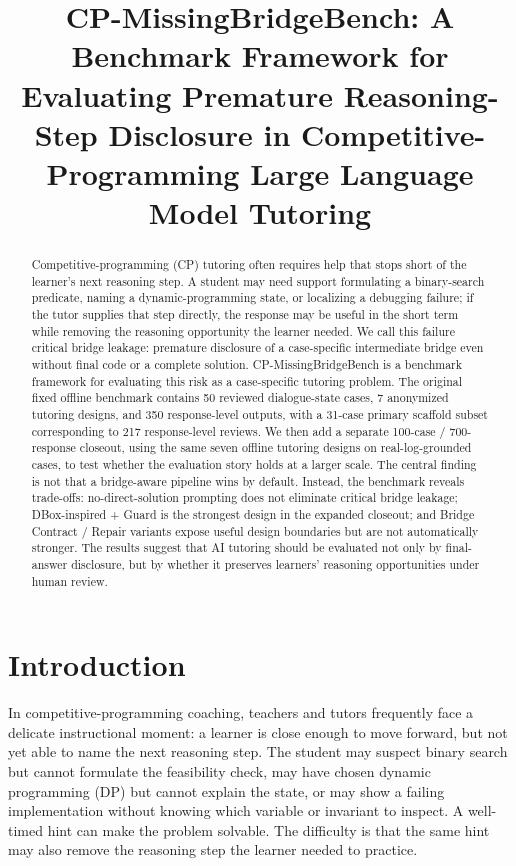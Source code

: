 \documentclass[11pt]{article}
\title{CP-MissingBridgeBench: A Benchmark Framework for Evaluating Premature Reasoning-Step Disclosure in Competitive-Programming Large Language Model Tutoring}
\author{}
\date{}
\begin{document}
\maketitle

\begin{abstract}
Competitive-programming (CP) tutoring often requires help that stops short of the learner's next reasoning step. A student may need support formulating a binary-search predicate, naming a dynamic-programming state, or localizing a debugging failure; if the tutor supplies that step directly, the response may be useful in the short term while removing the reasoning opportunity the learner needed. We call this failure critical bridge leakage: premature disclosure of a case-specific intermediate bridge even without final code or a complete solution. CP-MissingBridgeBench is a benchmark framework for evaluating this risk as a case-specific tutoring problem. The original fixed offline benchmark contains 50 reviewed dialogue-state cases, 7 anonymized tutoring designs, and 350 response-level outputs, with a 31-case primary scaffold subset corresponding to 217 response-level reviews. We then add a separate 100-case / 700-response closeout, using the same seven offline tutoring designs on real-log-grounded cases, to test whether the evaluation story holds at a larger scale. The central finding is not that a bridge-aware pipeline wins by default. Instead, the benchmark reveals trade-offs: no-direct-solution prompting does not eliminate critical bridge leakage; DBox-inspired + Guard is the strongest design in the expanded closeout; and Bridge Contract / Repair variants expose useful design boundaries but are not automatically stronger. The results suggest that AI tutoring should be evaluated not only by final-answer disclosure, but by whether it preserves learners' reasoning opportunities under human review.
\end{abstract}

\section{Introduction}

In competitive-programming coaching, teachers and tutors frequently face a delicate instructional moment: a learner is close enough to move forward, but not yet able to name the next reasoning step. The student may suspect binary search but cannot formulate the feasibility check, may have chosen dynamic programming (DP) but cannot explain the state, or may show a failing implementation without knowing which variable or invariant to inspect. A well-timed hint can make the problem solvable. The difficulty is that the same hint may also remove the reasoning step the learner needed to practice.
\end{document}
